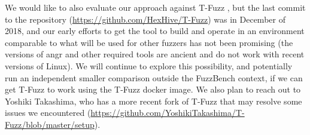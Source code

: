 We would like to also evaluate our approach against T-Fuzz \cite{tfuzz}, but the last commit to the repository (\url{https://github.com/HexHive/T-Fuzz}) was in December of 2018, and our early efforts to get the tool to build and operate in an environment comparable to what will be used for other fuzzers has not been promising (the versions of angr and other required tools are ancient and do not work with recent versions of Linux).  We will continue to explore this possibility, and potentially run an independent smaller comparison outside the FuzzBench context, if we can get T-Fuzz to work using the T-Fuzz docker image.  We also plan to reach out to Yoshiki Takashima, who has a more recent fork of T-Fuzz that may resolve some issues we encountered (\url{https://github.com/YoshikiTakashima/T-Fuzz/blob/master/setup}).
